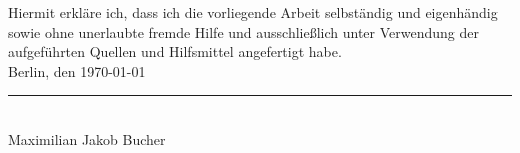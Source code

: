 Hiermit erkläre ich, dass ich die vorliegende Arbeit selbständig und eigenhändig sowie ohne unerlaubte fremde Hilfe und ausschließlich unter Verwendung der aufgeführten Quellen und Hilfsmittel angefertigt habe.\\

Berlin, den \textsc{\today}\\
\hspace{2.5cm}\rule{8cm}{0.4pt}\\
\hspace{2.5cm}Maximilian Jakob Bucher
